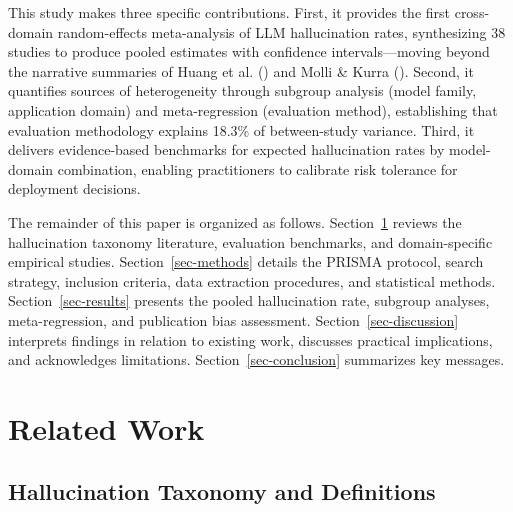 \documentclass[
  11pt,
  a4paper,
]{article}
\begin{document}
This study makes three specific contributions. First, it provides the
first cross-domain random-effects meta-analysis of LLM hallucination
rates, synthesizing 38 studies to produce pooled estimates with
confidence intervals---moving beyond the narrative summaries of Huang et
al. () and Molli \& Kurra
(). Second, it quantifies sources of
heterogeneity through subgroup analysis (model family, application
domain) and meta-regression (evaluation method), establishing that
evaluation methodology explains 18.3\% of between-study variance. Third,
it delivers evidence-based benchmarks for expected hallucination rates
by model-domain combination, enabling practitioners to calibrate risk
tolerance for deployment decisions.

The remainder of this paper is organized as follows.
Section~\ref{sec-related-work} reviews the hallucination taxonomy
literature, evaluation benchmarks, and domain-specific empirical
studies. Section~\ref{sec-methods} details the PRISMA protocol, search
strategy, inclusion criteria, data extraction procedures, and
statistical methods. Section~\ref{sec-results} presents the pooled
hallucination rate, subgroup analyses, meta-regression, and publication
bias assessment. Section~\ref{sec-discussion} interprets findings in
relation to existing work, discusses practical implications, and
acknowledges limitations. Section~\ref{sec-conclusion} summarizes key
messages.

\section{Related Work}\label{sec-related-work}

\subsection{Hallucination Taxonomy and
Definitions}\label{hallucination-taxonomy-and-definitions}
\end{document}
